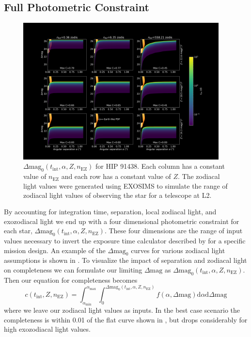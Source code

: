 \subsection{Full Photometric Constraint}
\label{sub:full_comp}
\begin{figure}
  \begin{center}
    \includegraphics[width=0.95\textwidth]{ch3/figures/fZ_fEZ_curves.png}
  \end{center}
  \caption{$\Delta\textrm{mag}_0(t_\textrm{int}, \alpha, Z, n_\textrm{EZ})$ for HIP 91438.
    Each column has a constant value of $n_\textrm{EZ}$ and each row has a
    constant value of $Z$. The zodiacal light values were generated
    using EXOSIMS to simulate the range of zodiacal light values of observing
  the star for a telescope at L2.}
  \label{fig:fZ_fEZ_curves}
\end{figure}

By accounting for integration time, separation, local zodiacal light, and 
exozodiacal light we end up with a four dimensional photometric constraint for
each star, $\Delta\textrm{mag}_0(t_\textrm{int}, \alpha, Z,
n_\textrm{EZ})$. These four dimensions are the range of input values necessary
to invert the exposure time calculator described by \citet{Nemati2014} for a
specific mission design. An example of the $\Delta\textrm{mag}_0$ curves for
various zodiacal light assumptions is shown in . 
To visualize the impact of separation and zodiacal light on completeness
we can formulate our limiting $\Delta\textrm{mag}$ as 
$\Delta\textrm{mag}_0(t_\textrm{int}, \alpha, Z, n_\textrm{EZ})$.
Then our equation for completeness becomes
\begin{equation}
  c(t_\textrm{int}, Z, n_\textrm{EZ}) = 
  \int_{\alpha_\textrm{min}}^{\alpha_\textrm{max}} 
  \int_{0}^{\Delta\textrm{mag}_0(t_\textrm{int}, \alpha, Z, n_\textrm{EZ})}
  f(\alpha, \Delta\textrm{mag})\textrm{d}\alpha \textrm{d}\Delta\textrm{mag}
  \label{eq:comp_integral}
\end{equation}
where we leave our zodiacal light values as inputs. In the best case scenario
the completeness is within 0.01 of the flat curve shown in
, but drops considerably for high exozodiacal
light values.

